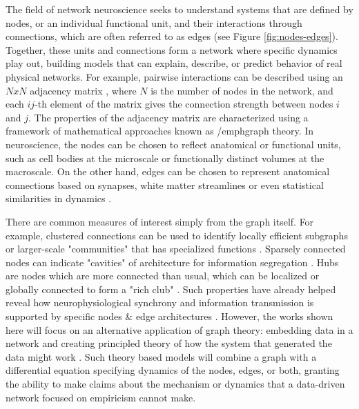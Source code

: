The field of network neuroscience seeks to understand systems that are defined by nodes, or an individual functional unit, and their interactions through connections, which are often referred to as edges (see Figure \ref{fig:nodes-edges}). Together, these units and connections form a network where specific dynamics play out, building models that can explain, describe, or predict behavior of real physical networks. For example, pairwise interactions can be described using an $NxN$ adjacency matrix \cite{bollobas_graph_1979}, where $N$ is the number of nodes in the network, and each $ij$-th element of the matrix gives the connection strength between nodes $i$ and $j$. The properties of the adjacency matrix are characterized using a framework of mathematical approaches known as /emph{graph theory}. In neuroscience, the nodes can be chosen to reflect anatomical or functional units, such as cell bodies at the microscale or functionally distinct volumes at the macroscale. On the other hand, edges can be chosen to represent anatomical connections based on synapses, white matter streamlines or even statistical similarities in dynamics \cite{he_small-world_2007,varshney_structural_2011,bassett_conserved_2011,friston_functional_2011}. 

There are common measures of interest simply from the graph itself. For example, clustered connections can be used to identify locally efficient subgraphs or larger-scale "communities" that has specialized functions \cite{sporns_modular_2016}. Sparsely connected nodes can indicate "cavities" of architecture for information segregation \cite{sizemore_cliques_2018,reimann_cliques_2017}. Hubs are nodes which are more connected than usual, which can be localized or globally connected to form a "rich club" \cite{bassett_small-world_2006}. Such properties have already helped reveal how neurophysiological synchrony and information transmission is supported by specific nodes \& edge architectures \cite{borgers_synchronization_2003,ganmor_sparse_2011,avena-koenigsberger_communication_2017}. However, the works shown here will focus on an alternative application of graph theory: embedding data in a network and creating principled theory of how the system that generated the data might work \cite{abbott_theoretical_2008}. Such theory based models will combine a graph with a differential equation specifying dynamics of the nodes, edges, or both, granting the ability to make claims about the mechanism or dynamics that a data-driven network focused on empiricism cannot make. 

